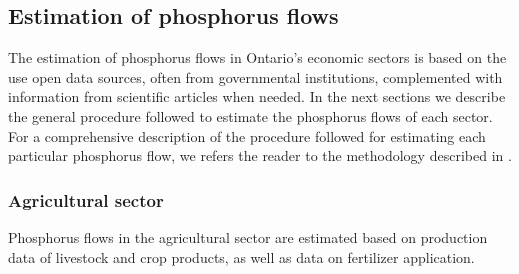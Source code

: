 \documentclass[authoryear]{elsarticle}
\begin{document}

\subsection{Estimation of phosphorus flows}
The estimation of phosphorus flows in Ontario's economic sectors is based on
the use open data sources, often from governmental institutions, complemented with information from scientific articles when needed. In the next sections we describe the general procedure followed to estimate the phosphorus flows of each sector. For a comprehensive description of the procedure followed for estimating each particular phosphorus flow, we refers the reader to the methodology described in \citet{PFlows_Ontario}.

\subsubsection{Agricultural sector} \label{section:AgriSector}
Phosphorus flows in the agricultural sector are estimated based on production data of livestock and crop products, as well as data on fertilizer application.
\end{document}
